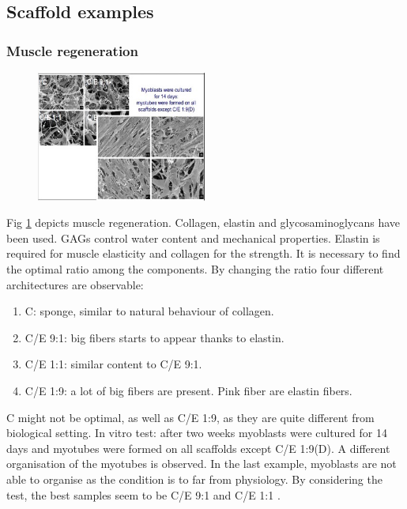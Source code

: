     \subsection{Scaffold examples}

        \subsubsection{Muscle regeneration}

        \begin{figure}[h]
            \centering
            \includegraphics[width=0.5\textwidth]{myoblast.jpg}
            \caption{\label{fig:myoblast}}
        \end{figure}

        Fig \ref{fig:myoblast} depicts muscle regeneration.
        Collagen, elastin and glycosaminoglycans have been used.
        GAGs control water content and mechanical properties.
        Elastin is required for muscle elasticity and collagen for the strength.
        It is necessary to find the optimal ratio among the components.
        By changing the ratio  four different architectures are observable:

        \begin{multicols}{2}
            \begin{enumerate}
                \item C: sponge, similar to natural behaviour of collagen.
                \item C/E 9:1: big fibers starts to appear thanks to elastin.
                \item C/E 1:1: similar content to C/E 9:1.
                \item C/E 1:9: a lot of big fibers are present.
                    Pink fiber are elastin fibers.
            \end{enumerate}
        \end{multicols}

        C might not be optimal, as well as C/E 1:9, as they are quite different from biological setting.
        In vitro test: after two weeks myoblasts were cultured for 14 days and myotubes were formed on all scaffolds except C/E 1:9(D).
        A different organisation of the myotubes is observed.
        In the last example, myoblasts are not able to organise as the condition is to far from physiology.
        By considering the test, the best samples seem to be C/E 9:1 and C/E 1:1 .

